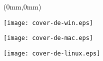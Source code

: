 
\pagestyle{empty}
\frontmatter
\begin{FRONTCOVER}
\begin{titlepage}
\begin{textblock*}{210mm}(0mm,0mm)
\begin{WINDOWS}
\texttt{[image: cover-de-win.eps]}
\end{WINDOWS}
\begin{MAC}
\texttt{[image: cover-de-mac.eps]}
\end{MAC}
\begin{LINUX}
\texttt{[image: cover-de-linux.eps]}
\end{LINUX}
\end{textblock*}
\begin{flushright}



\end{flushright}
\end{titlepage}
\end{FRONTCOVER}

